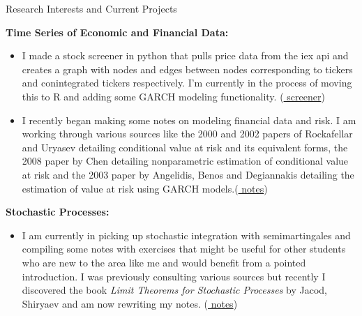 \documentclass{resume} %
\begin{document}
\begin{rSection}{Research Interests and Current Projects}

{\bf Time Series of Economic and Financial Data:}
\begin{itemize}
\item I made a stock screener in python that pulls price data from the iex api and creates a graph with nodes and edges between nodes corresponding to tickers and conintegrated tickers respectively. I'm currently in the process of moving this to R and adding some GARCH modeling functionality. (\href{https://github.com/carsonaj/Finance/tree/master/market}{\color{blue} screener})

\item I recently began making some notes on modeling financial data and risk. I am working through various sources like the 2000 and 2002 papers of Rockafellar and Uryasev detailing conditional value at risk and its equivalent forms, the 2008 paper by Chen detailing nonparametric estimation of conditional value at risk and the 2003 paper by Angelidis, Benos and Degiannakis detailing the estimation of value at risk using GARCH models.(\href{https://github.com/carsonaj/Math/blob/master/Portfolio%20Theory/Portfolio%20Theory%20Notes.pdf}{\color{blue} notes})
\end{itemize}

{\bf Stochastic Processes:}
\begin{itemize}
\item I am currently in picking up stochastic integration with semimartingales and compiling some notes with exercises that might be useful for other students who are new to the area like me and would benefit from a pointed introduction. I was previously consulting various sources but recently I discovered the book {\em Limit Theorems for Stochastic Processes} by Jacod, Shiryaev and am now rewriting my notes. (\href{https://github.com/carsonaj/Math/blob/master/Stochastic%20Analysis/Stochastic%20Processes%20-%20James.pdf}{{\color{blue} notes}}) 
\end{itemize}


\end{rSection}
\end{document}
